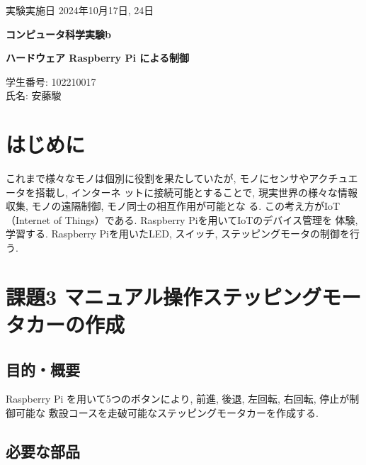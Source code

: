 \documentclass{ltjsarticle} %
\begin{document}
\thispagestyle{empty}
\begin{flushright}
{\large 実験実施日 2024年10月17日, 24日{\hspace{5cm}}} 
\end{flushright}

\vspace*{\fill}
\centering
{\Huge\bf コンピュータ科学実験b}
\vspace*{1cm}

{\huge\bf ハードウェア Raspberry Pi による制御}
\vspace*{\fill}

\vspace*{\fill}

\vspace*{\fill}

\begin{flushright}
{\large 学生番号: 102210017} \\ %
{\large 氏名: 安藤駿} \\
\end{flushright}

\clearpage

\addtocounter{page}{-1}
\raggedright
\setlength{\parindent}{1em}

\section{はじめに}
これまで様々なモノは個別に役割を果たしていたが, モノにセンサやアクチュエータを搭載し, インターネ
ットに接続可能とすることで, 現実世界の様々な情報収集, モノの遠隔制御, モノ同⼠の相互作⽤が可能とな
る. この考え⽅がIoT（Internet of Things）である. Raspberry Piを⽤いてIoTのデバイス管理を
体験, 学習する. Raspberry Piを⽤いたLED, スイッチ, ステッピングモータの制御を⾏う.


\section{課題3  マニュアル操作ステッピングモータカーの作成}

\subsection{目的・概要}
Raspberry Pi を⽤いて5つのボタンにより, 前進, 後退, 左回転, 右回転, 停⽌が制御可能な
敷設コースを⾛破可能なステッピングモータカーを作成する. 

\subsection{必要な部品}
\end{document}
